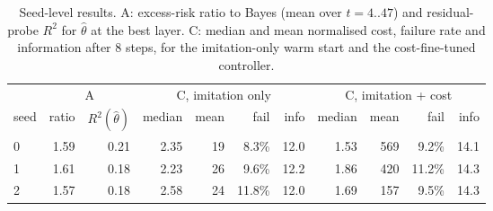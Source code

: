\begin{table}[h]
\centering\small
\caption{Seed-level results. A: excess-risk ratio to Bayes (mean over $t{=}4..47$) and residual-probe $R^2$ for $\hat\theta$ at the best layer. C: median and mean normalised cost, failure rate and information after 8 steps, for the imitation-only warm start and the cost-fine-tuned controller.}\label{tab:seeds}
\begin{tabular}{lrr|rrrr|rrrr}
\toprule
& \multicolumn{2}{c|}{A} & \multicolumn{4}{c|}{C, imitation only} & \multicolumn{4}{c}{C, imitation + cost} \\
seed & ratio & $R^2(\hat\theta)$ & median & mean & fail & info & median & mean & fail & info \\
\midrule
0 & 1.59 & 0.21 & 2.35 & 19 & 8.3\% & 12.0 & 1.53 & 569 & 9.2\% & 14.1 \\
1 & 1.61 & 0.18 & 2.23 & 26 & 9.6\% & 12.2 & 1.86 & 420 & 11.2\% & 14.3 \\
2 & 1.57 & 0.18 & 2.58 & 24 & 11.8\% & 12.0 & 1.69 & 157 & 9.5\% & 14.3 \\
\bottomrule
\end{tabular}
\end{table}
